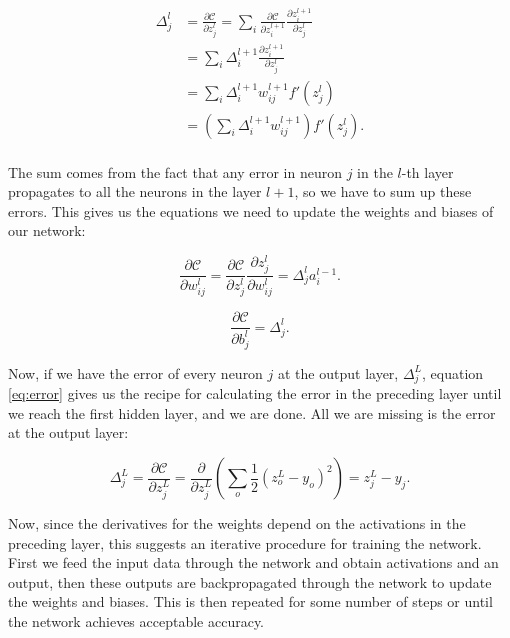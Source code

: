 \begin{equation}\label{eq:error}
\begin{split}
\Delta_j^l &= \frac{\partial \mathcal{C}}{\partial z_j^l} = \sum_i \frac{\partial \mathcal{C}}{\partial z_i^{l+1}}
\frac{\partial z_i^{l+1}}{\partial z_j^l} \\
           &= \sum_i \Delta_i^{l+1} \frac{\partial z_i^{l+1}}{\partial z_j^l} \\
           &= \sum_i \Delta_i^{l+1} w_{ij}^{l+1} f'(z_j^l) \\
           &= \left( \sum_i \Delta_i^{l+1} w_{ij}^{l+1} \right) f'(z_j^l) .\\
\end{split}
\end{equation}

The sum comes from the fact that any error in neuron $j$ in the $l$-th layer propagates to all the neurons
in the layer $l + 1$, so we have to sum up these errors.
This gives us the equations we need to update the weights and biases of our network:

\begin{equation}
 \frac{\partial \mathcal{C}}{\partial w_{ij}^l} 
= \frac{\partial \mathcal{C}}{\partial z_j^l} 
\frac{\partial z_j^l}{\partial w_{ij}^l}
= \Delta_j^l a_i^{l-1} .
\end{equation}

\begin{equation}
 \frac{\partial \mathcal{C}}{\partial b_{j}^l} = \Delta_j^l .
\end{equation}

Now, if we have the error of every neuron $j$ at the output layer,
$\Delta_j^L$, equation \ref{eq:error}
gives us the recipe for calculating the error in the preceding layer until we reach the first hidden layer, 
and we are done. All we are missing is the error at the output layer:

\begin{equation}
\Delta_j^L = \frac{\partial \mathcal{C}}{\partial z_j^L} 
= \frac{\partial}{\partial z_j^L} \left(
    \sum_o \frac{1}{2}\left( z_o^L - y_o\right)^2 \right) 
    = z_j^L - y_j .
\end{equation}

Now, since the derivatives for the weights depend on
the activations in the preceding layer, this suggests
an iterative procedure for training the network.
First we feed the input data through the network
and obtain activations and an output, then these
outputs are backpropagated through the network to update the
weights and biases. This is then repeated for some number
of steps or until the network achieves acceptable accuracy.

